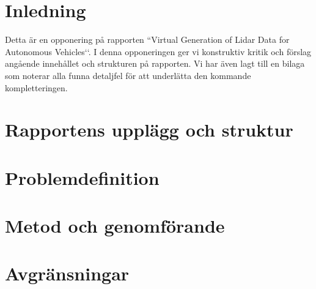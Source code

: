 \documentclass[12pt,a4paper,twoside,openright]{report}
\begin{document}
 


\newcommand{\varHeadline}{Opponering av DATX02-17-10}
\newcommand{\varSubtitle}{Av DATX02-17-12}
\newcommand{\varDepartment}{Department of Computer Science and Engineering}
\newcommand{\varNames}{André Perzon, Björn Strömberg, Chi Thong Luong,  \\
Elias Forsberg, Jesper Åberg, Jon Johnsson}




\section*{Inledning}

Detta är en opponering på rapporten ``Virtual Generation of Lidar Data for
Autonomous Vehicles‘‘. I denna opponeringen ger vi konstruktiv kritik och förslag angående innehållet och strukturen på rapporten. Vi har även lagt till en bilaga som noterar alla funna detaljfel för att underlätta den kommande kompletteringen.

\section*{Rapportens upplägg och struktur}

\section*{Problemdefinition}

\section*{Metod och genomförande}

\section*{Avgränsningar}
\end{document}

